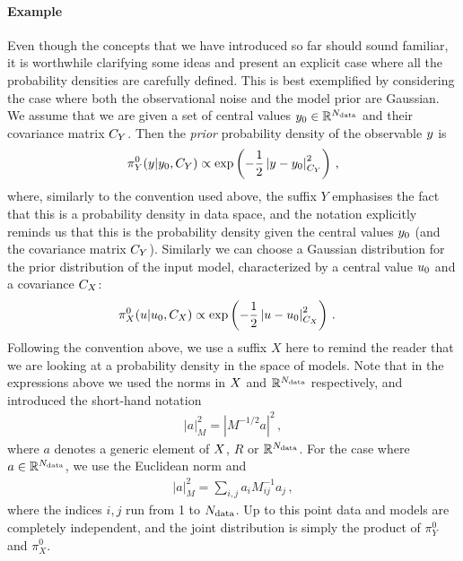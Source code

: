 \paragraph{Example}

Even though the concepts that we have introduced so far should sound familiar,
it is worthwhile clarifying some ideas and present an
explicit case where all the probability densities are carefully defined.
This is best exemplified by considering the case where both the observational
noise and the model prior are Gaussian. We assume that we are given a set of
central values $y_0 \in \mathbb{R}^{N_{\rm data}}$ and their covariance matrix
$C_{Y}$. Then the {\em prior} probability density of the observable
$y$ is 
\begin{equation}
  \label{eq:PriorData}
  \pi_{Y}^0(y|y_0,C_{Y}) \propto \exp\left(
    -\frac12 \left| y - y_0 \right|_{C_{Y}}^2
    \right)\, ,
\end{equation}
where, similarly to the convention used above, the suffix $Y$ emphasises the
fact that this is a probability density in data space, and the notation
explicitly reminds us that this is the probability density given the central
values $y_0$ (and the covariance matrix $C_{Y}$). Similarly we
can choose a Gaussian distribution for the prior distribution of the input
model, characterized by a central value $u_0$ and a covariance
$C_X$:
\begin{align}
  \label{eq:PiZeroGauss}
  \pi_{X}^0(u|u_0,C_X)  
  &\propto \exp\left(
              -\frac12 \left| u - u_0 \right|_{C_X}^2
              \right)\, .
\end{align}
Following the convention above, we use a suffix $X$ here to remind the reader
that we are looking at a probability density in the space of models. Note that
in the expressions above we used the norms in $X$ and $\mathbb{R}^{N_{\rm data}}$
respectively, and introduced the short-hand notation
\begin{align}
  \left|a\right|_M^2 = \left| M^{-1/2} a\right|^2\, ,
\end{align}
where $a$ denotes a generic element of $X$, $R$ or $\mathbb{R}^{N_{\rm data}}$.
For the case where $a \in \mathbb{R}^{N_{\rm data}}$, we use the Euclidean norm and
\begin{align}
  \left| a \right|_M^2 = \sum_{i,j} a_i M^{-1}_{ij} a_j\, ,
\end{align}
where the indices $i,j$ run from 1 to $N_{\rm data}$.  
Up to this point data and models are completely independent, and the joint
distribution is simply the product of $\pi_{Y}^0$ and $\pi_{X}^0$. 

